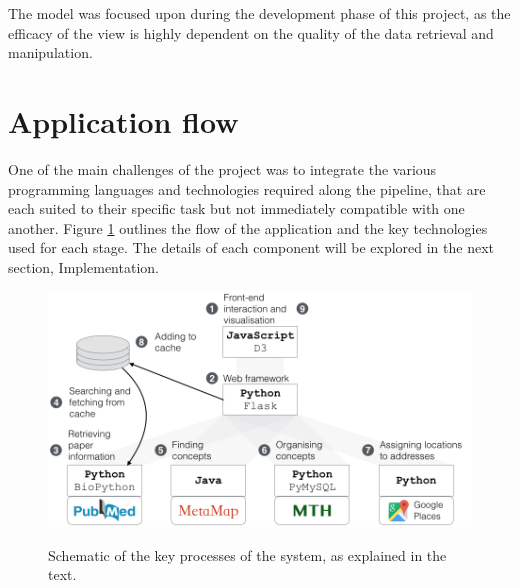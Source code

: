 \documentclass[Report.tex]{subfiles}
\begin{document}
\noindent The model was focused upon during the development phase of this project, as the efficacy of the view is highly dependent on the quality of the data retrieval and manipulation. 

\section{Application flow}
One of the main challenges of the project was to integrate the various programming languages and technologies required along the pipeline, that are each suited to their specific task but not immediately compatible with one another. Figure \ref{fig:flow} outlines the flow of the application and the key technologies used for each stage. The details of each component will be explored in the next section, Implementation.

\begin{figure}[h!]
	\includegraphics[width=\textwidth]{../lib/images/flow.png}
	\label{fig:flow}
	\caption{Schematic of the key processes of the system, as explained in the text.}
\end{figure}
\end{document}
